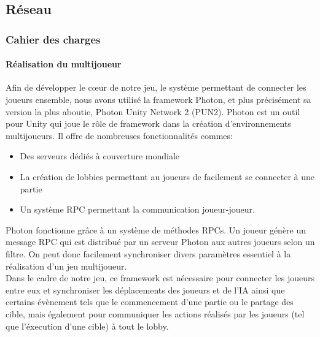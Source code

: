 \subsection{Réseau}

    \vspace{0.5cm}
    \subsubsection{Cahier des charges}
    \vspace{0.5cm}

        \paragraph{Réalisation du multijoueur}

            Afin de développer le cœur de notre jeu, le système permettant de connecter les joueurs ensemble, nous avons utilisé la framework Photon, et plus précisément 
            sa version la plus aboutie, Photon Unity Network 2 (PUN2). \newline
            Photon est un outil pour Unity qui joue le rôle de framework dans la création d'environnements multijoueurs. Il offre de nombreuses fonctionnalités commes:
            
            \begin{itemize}
                \item Des serveurs dédiés à couverture mondiale
                \item La création de lobbies permettant au joueurs de facilement se connecter à une partie
                \item Un système RPC permettant la communication joueur-joueur.
            \end{itemize}

            Photon fonctionne grâce à un système de méthodes RPCs. Un joueur génère un message RPC qui est distribué par un serveur Photon aux autres joueurs selon un filtre. On peut donc facilement synchroniser divers paramètres essentiel à la réalisation d'un jeu multijoueur.\\
            Dans le cadre de notre jeu, ce framework est nécessaire pour connecter les joueurs entre eux et synchroniser les déplacements des joueurs et de l'IA ainsi que certains évènement tels que le commencement d'une partie ou le partage des cible, mais également pour communiquer les actions réalisés par les joueurs (tel que l'éxecution d'une cible) à tout le lobby.
            
